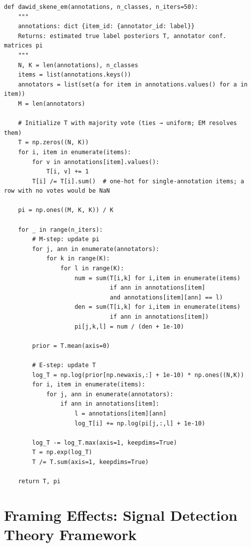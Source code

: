 \begin{lstlisting}[style=python, caption={Dawid-Skene EM (simplified)}]
def dawid_skene_em(annotations, n_classes, n_iters=50):
    """
    annotations: dict {item_id: {annotator_id: label}}
    Returns: estimated true label posteriors T, annotator conf. matrices pi
    """
    N, K = len(annotations), n_classes
    items = list(annotations.keys())
    annotators = list(set(a for item in annotations.values() for a in item))
    M = len(annotators)

    # Initialize T with majority vote (ties → uniform; EM resolves them)
    T = np.zeros((N, K))
    for i, item in enumerate(items):
        for v in annotations[item].values():
            T[i, v] += 1
        T[i] /= T[i].sum()  # one-hot for single-annotation items; a row with no votes would be NaN

    pi = np.ones((M, K, K)) / K

    for _ in range(n_iters):
        # M-step: update pi
        for j, ann in enumerate(annotators):
            for k in range(K):
                for l in range(K):
                    num = sum(T[i,k] for i,item in enumerate(items)
                              if ann in annotations[item]
                              and annotations[item][ann] == l)
                    den = sum(T[i,k] for i,item in enumerate(items)
                              if ann in annotations[item])
                    pi[j,k,l] = num / (den + 1e-10)

        prior = T.mean(axis=0)

        # E-step: update T
        log_T = np.log(prior[np.newaxis,:] + 1e-10) * np.ones((N,K))
        for i, item in enumerate(items):
            for j, ann in enumerate(annotators):
                if ann in annotations[item]:
                    l = annotations[item][ann]
                    log_T[i] += np.log(pi[j,:,l] + 1e-10)

        log_T -= log_T.max(axis=1, keepdims=True)
        T = np.exp(log_T)
        T /= T.sum(axis=1, keepdims=True)

    return T, pi
\end{lstlisting}

\section{Framing Effects: Signal Detection Theory Framework}

